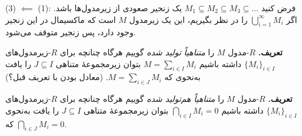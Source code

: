 \hrulefill


(3) \(\impliedby\) (1):
فرض کنید $M_1 \subseteq M_2 \subseteq M_3 \subseteq \dots$ یک زنجیر صعودی از زیرمدول‌ها باشد.
اگر $\bigcup_{i=1}^\infty M_i$ را در نظر بگیریم، این یک زیرمدول $M$ است که ماکسیمال در این زنجیر وجود دارد، پس زنجیر متوقف می‌شود.


\hrulefill



\textbf{تعریف.} $R$-مدول $M$ را \textit{ متناهیاً تولید شده} گوییم هرگاه
چنانچه برای
\(R\)-زیرمدول‌های
\(\{M_i\}_{i\in I}\)
داشته باشیم
\(M = \sum_{i\in I} M_i\)
بتوان زیرمجموعه‌ٔ متناهی
\(J \subseteq I\)
را یافت به‌نحوی که
\(M = \sum_{i\in J} M_i\).
(معادل بودن با تعریف قبل؟)

\textbf{تعریف.} $R$-مدول $M$ را \textit{ متناهیاً هم‌تولید شده} گوییم هرگاه
چنانچه برای
\(R\)-زیرمدول‌های
\(\{M_i\}_{i\in I}\)
داشته باشیم
\( \bigcap_{i\in I} M_i = 0\)
بتوان زیرمجموعه‌ٔ متناهی
\(J \subseteq I\)
را یافت به‌نحوی که
\( \bigcap_{i\in J} M_i = 0\).
